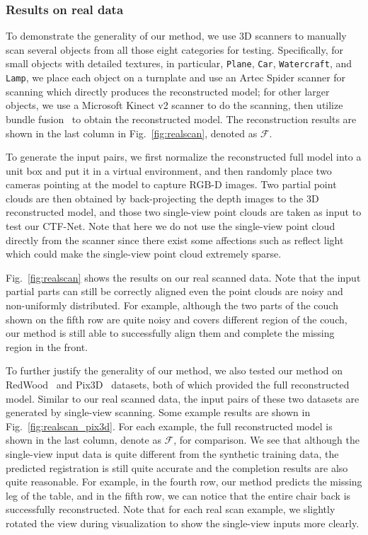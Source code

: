 \subsubsection{Results on real data}
To demonstrate the generality of our method, we use 3D scanners to manually scan several objects from all those eight categories for testing. Specifically, for small objects with detailed textures, in particular, \texttt{Plane}, \texttt{Car}, \texttt{Watercraft}, and \texttt{Lamp}, we place each object on a turnplate and use an Artec Spider scanner for scanning which directly produces the reconstructed model; for other larger objects, we use a Microsoft Kinect v2 scanner to do the scanning, then utilize bundle fusion~\cite{dai2017bundle} to obtain the reconstructed model. %
The reconstruction results are shown in the last column in Fig.~\ref{fig:realscan}, denoted as $\mathcal{F}$.

To generate the input pairs, we first normalize the reconstructed full model into a unit box and put it in a virtual environment, and then randomly place two cameras pointing at the model to capture RGB-D images. Two partial point clouds are then obtained by back-projecting the depth images to the 3D reconstructed model, and those two single-view point clouds are taken as input to test our CTF-Net. 
Note that here we do not use the single-view point cloud directly from the scanner since there exist some affections such as reflect light which could make the single-view point cloud extremely sparse.


Fig.~\ref{fig:realscan} shows the results on our real scanned data. Note that the input partial parts can still be correctly aligned even the point clouds are noisy and non-uniformly distributed. 
For example, although the two parts of the couch shown on the fifth row are quite noisy and covers different region of the couch, our method is still able to successfully align them and complete the missing region in the front.

To further justify the generality of our method, we also tested our method on RedWood~\cite{choi2016large} and Pix3D~\cite{sun2018pix3d} datasets, both of which provided the full reconstructed model.
Similar to our real scanned data, the input pairs of these two datasets are generated by single-view scanning.
Some example results are shown in Fig.~\ref{fig:realscan_pix3d}. %
For each example, the full reconstructed model is shown in the last column, denote as $\mathcal{F}$, for comparison. 
We see that although the single-view input data is quite different from the synthetic training data, the predicted registration is still quite accurate and the completion results are also quite reasonable.
For example, in the fourth row, our method predicts the missing leg of the table, and in the fifth row, we can notice that the entire chair back is successfully reconstructed.
Note that for each real scan example, we slightly rotated the view during visualization to show the single-view inputs more clearly.


